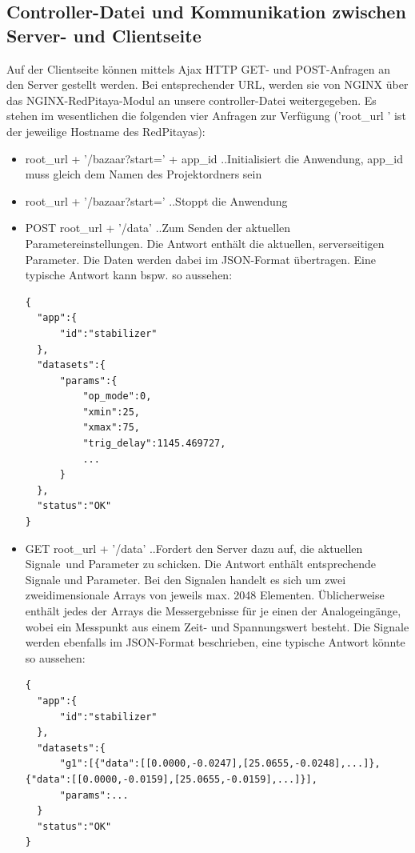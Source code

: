 \documentclass[11pt]{scrartcl}
\begin{document}
\subsection{Controller-Datei und Kommunikation zwischen Server- und Clientseite}
Auf der Clientseite können mittels Ajax HTTP GET- und POST-Anfragen an den Server gestellt werden. Bei entsprechender URL, werden sie von NGINX über das NGINX-RedPitaya-Modul an unsere controller-Datei weitergegeben. Es stehen im wesentlichen die folgenden vier Anfragen zur Verfügung ('root\_url ' ist der jeweilige Hostname des RedPitayas):
\begin{itemize}
\item root\_url + '/bazaar?start=' + app\_id ..Initialisiert die Anwendung, app\_id muss gleich dem Namen des Projektordners sein
\item root\_url + '/bazaar?start=' ..Stoppt die Anwendung
\item POST root\_url + '/data' ..Zum Senden der aktuellen Parametereinstellungen. Die Antwort enthält die aktuellen, serverseitigen Parameter. Die Daten werden dabei im JSON-Format übertragen. Eine typische Antwort kann bspw. so aussehen:
\begin{lstlisting}
{
  "app":{
	  "id":"stabilizer"
  },
  "datasets":{
	  "params":{
		  "op_mode":0,
		  "xmin":25,
		  "xmax":75,
		  "trig_delay":1145.469727,
		  ...
	  }
  },
  "status":"OK"
}
\end{lstlisting}
\item GET root\_url + '/data' ..Fordert den Server dazu auf, die aktuellen \grqq Signale\grqq~und Parameter zu schicken. Die Antwort enthält entsprechende Signale und Parameter. Bei den Signalen handelt es sich um zwei zweidimensionale Arrays von jeweils max. 2048 Elementen. Üblicherweise enthält jedes der Arrays die Messergebnisse für je einen der Analogeingänge, wobei ein Messpunkt aus einem Zeit- und Spannungswert besteht. Die Signale werden ebenfalls im JSON-Format beschrieben, eine typische Antwort könnte so aussehen:
\begin{lstlisting}
{
  "app":{
	  "id":"stabilizer"
  },
  "datasets":{
	  "g1":[{"data":[[0.0000,-0.0247],[25.0655,-0.0248],...]}, {"data":[[0.0000,-0.0159],[25.0655,-0.0159],...]}],
	  "params":...
  }
  "status":"OK"
}
\end{lstlisting}
\end{itemize} 
\end{document}
